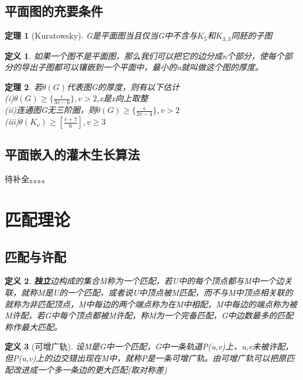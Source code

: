 \documentclass[UTF8]{ctexart}
\newtheorem{dfnt}{定义}
\newtheorem{thr}{定理}
\begin{document}
\subsection{平面图的充要条件}
\begin{thr}[Kuratowsky]
G是平面图当且仅当G中不含与$K_5$和$K_{3,3}$同胚的子图
\end{thr}
\begin{dfnt}
如果一个图不是平面图，那么我们可以把它的边分成n个部分，使每个部分的导出子图都可以镶嵌到一个平面中，最小的n就叫做这个图的厚度。
\end{dfnt}
\begin{thr}
若$\theta (G)$代表图G的厚度，则有以下估计\\(i)$\theta(G) \geq \{\frac{\epsilon}{3v-6}\},v>2$,{x}是x向上取整\\(ii)连通图G无三阶圈，则$\theta (G) \geq \{\frac{\epsilon}{2v-4}\},v>2$ \\(iii)$\theta (K_{v}) \geq [\frac{v+7}{6}],v\geq 3$
\end{thr}
\subsection{平面嵌入的灌木生长算法}
待补全。。。。
\section{匹配理论}
\subsection{匹配与许配}
\begin{dfnt}
\textbf{独立}边构成的集合M称为一个匹配，若U中的每个顶点都与M中一个边关联，就称M是U的一个匹配，或者说U中顶点被M匹配，而不与M中顶点相关联的就称为非匹配顶点，M中每边的两个端点称为在M中相配，M中每边的端点称为被M许配，若G中每个顶点都被M许配，称M为一个完备匹配，G中边数最多的匹配称作最大匹配。
\end{dfnt}
\begin{dfnt}[可增广轨]
设M是G中一个匹配，G中一条轨道P(u,v)上，u,v未被许配，但P(u,v)上的边交错出现在M中，就称P是一条可增广轨。由可增广轨可以把原匹配改进成一个多一条边的更大匹配(取对称差)
\end{dfnt}
\end{document}
